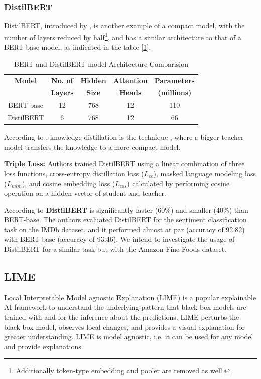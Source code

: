 \documentclass[11pt]{article}
\begin{document}
\subsubsection{DistilBERT}
DistilBERT, introduced by \cite{distilbert}, is another example of a compact model, with the number of layers reduced by half\footnote{Additionally token-type embedding and pooler are removed as well.}, and has a similar architecture to that of a BERT-base model, as indicated in the table [\ref{tab:bert_distil}].
 \begin{table}[h!]
 \scriptsize
     \centering
     \begin{tabular}{c c c c c}
     \hline 
        \textbf{Model} & \textbf{No. of}  & \textbf{Hidden} & \textbf{Attention} & \textbf{Parameters} \\
        &\textbf{Layers}& \textbf{Size} & \textbf{Heads} & \textbf{(millions)} \\
        \hline 
         {BERT-base} &12 &768 &12&110 \\
         {DistilBERT} & 6& 768& 12&66\\    
         \hline   
     \end{tabular}
     \caption{BERT and DistilBERT model Architecture Comparision}
     \label{tab:bert_distil}
 \end{table}
According to \cite{smallBERT}, knowledge distillation is the technique \cite{kdistillation},  where a bigger teacher model transfers the knowledge to a more compact model.


\textbf{Triple Loss:}
Authors trained DistilBERT using a linear combination of three loss functions, cross-entropy distillation loss ($L_{ce}$), masked language modeling loss ($L_{mlm}$), and cosine embedding loss ($L_{cos}$) calculated by performing cosine operation on a hidden vector of student and teacher.

According to \cite{distilbert} \textbf{DistilBERT} is significantly faster (60\%) and smaller (40\%) than BERT-base. The authors evaluated DistilBERT for the sentiment classification task on the IMDb dataset, and it performed almost at par (accuracy of 92.82) with BERT-base (accuracy of 93.46). We intend to investigate the usage of DistilBERT for a similar task but with the Amazon Fine Foods dataset.
\subsection{LIME}
\textbf{L}ocal \textbf{I}nterpretable \textbf{M}odel agnostic \textbf{E}xplanation (LIME) \cite{LIME} is a popular explainable AI framework to understand the underlying pattern that black box models are trained with and for the inference about the predictions. LIME perturbs the black-box model, observes local changes, and provides a visual explanation for greater understanding. LIME is model agnostic, i.e. it can be used for any model and provide explanations.
\end{document}
